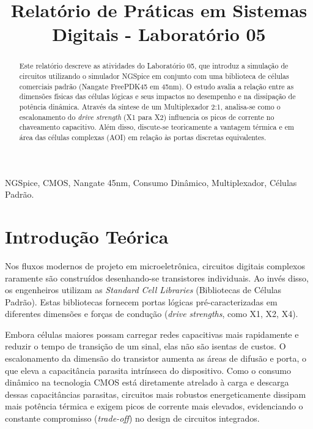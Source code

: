 \documentclass[conference]{IEEEtran}
\begin{document}
\title{Relatório de Práticas em Sistemas Digitais - Laboratório 05}

\author{
}

\maketitle

\begin{abstract}
Este relatório descreve as atividades do Laboratório 05, que introduz a simulação de circuitos utilizando o simulador NGSpice em conjunto com uma biblioteca de células comerciais padrão (Nangate FreePDK45 em 45nm). O estudo avalia a relação entre as dimensões físicas das células lógicas e seus impactos no desempenho e na dissipação de potência dinâmica. Através da síntese de um Multiplexador 2:1, analisa-se como o escalonamento do \textit{drive strength} (X1 para X2) influencia os picos de corrente no chaveamento capacitivo. Além disso, discute-se teoricamente a vantagem térmica e em área das células complexas (AOI) em relação às portas discretas equivalentes.
\end{abstract}

\begin{IEEEkeywords}
NGSpice, CMOS, Nangate 45nm, Consumo Dinâmico, Multiplexador, Células Padrão.
\end{IEEEkeywords}

\section{Introdução Teórica}
Nos fluxos modernos de projeto em microeletrônica, circuitos digitais complexos raramente são construídos desenhando-se transistores individuais. Ao invés disso, os engenheiros utilizam as \textit{Standard Cell Libraries} (Bibliotecas de Células Padrão). Estas bibliotecas fornecem portas lógicas pré-caracterizadas em diferentes dimensões e forças de condução (\textit{drive strengths}, como X1, X2, X4). 

Embora células maiores possam carregar redes capacitivas mais rapidamente e reduzir o tempo de transição de um sinal, elas não são isentas de custos. O escalonamento da dimensão do transistor aumenta as áreas de difusão e porta, o que eleva a capacitância parasita intrínseca do dispositivo. Como o consumo dinâmico na tecnologia CMOS está diretamente atrelado à carga e descarga dessas capacitâncias parasitas, circuitos mais robustos energeticamente dissipam mais potência térmica e exigem picos de corrente mais elevados, evidenciando o constante compromisso (\textit{trade-off}) no design de circuitos integrados.
\end{document}

